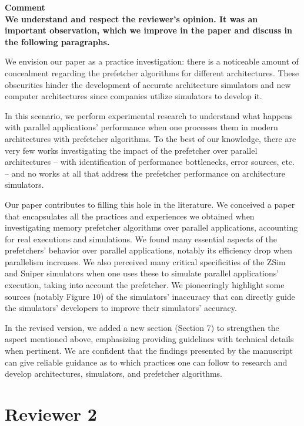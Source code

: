 \documentclass{article}
\newcounter{answer}
\newenvironment{answer}
{ \refstepcounter{answer}\vspace{0.5cm}\bfseries\noindent Comment~\theanswer\\ }
{ \vspace{0.5cm} }
\begin{document}
\begin{answer}

We understand and respect the reviewer's opinion. It was an important observation, which we improve in the paper and discuss in the following paragraphs.

We envision our paper as a practice investigation: there is a noticeable amount of concealment regarding the prefetcher algorithms for different architectures. These obscurities hinder the development of accurate architecture simulators and new computer architectures since companies utilize simulators to develop it.

In this scenario, we perform experimental research to understand what happens with parallel applications' performance when one processes them in modern architectures with prefetcher algorithms. To the best of our knowledge, there are very few works investigating the impact of the prefetcher over parallel architectures -- with identification of performance bottlenecks, error sources, etc. -- and no works at all that address the prefetcher performance on architecture simulators.

Our paper contributes to filling this hole in the literature. We conceived a paper that encapsulates all the practices and experiences we obtained when investigating memory prefetcher algorithms over parallel applications, accounting for real executions and simulations. 
We found many essential aspects of the prefetchers' behavior over parallel applications, notably its efficiency drop when parallelism increases. We also perceived many critical specificities of the ZSim and Sniper simulators when one uses these to simulate parallel applications' execution, taking into account the prefetcher. We pioneeringly highlight some sources (notably Figure 10) of the simulators' inaccuracy that can directly guide the simulators' developers to improve their simulators' accuracy.

In the revised version, we added a new section (Section 7) to strengthen the aspect mentioned above, emphasizing providing guidelines with technical details when pertinent. We are confident that the findings presented by the manuscript can give reliable guidance as to which practices one can follow to research and develop architectures, simulators, and prefetcher algorithms.

\end{answer}

\section*{Reviewer 2}
\end{document}

